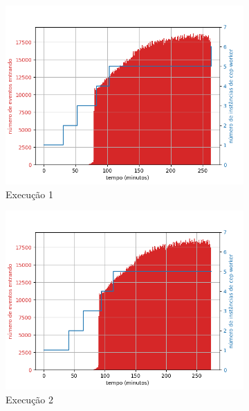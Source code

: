 \begin{figure}[p]
\begin{subfigure}{.5\textwidth}
  \centering
  \includegraphics[width=\linewidth]{figuras/graphics/carga_e_workers_total6-dez-is.png}  
  \caption{Execução 1}
  \label{fig:cewt-6-dez-is}
\end{subfigure}
\begin{subfigure}{.5\textwidth}
  \centering
  \includegraphics[width=\linewidth]{figuras/graphics/carga_e_workers_total7-dez-is.png}  
  \caption{Execução 2}
  \label{fig:cewt-7-dez-is}
\end{subfigure}
\begin{subfigure}{.5\textwidth}

\end{subfigure}
\end{figure}
